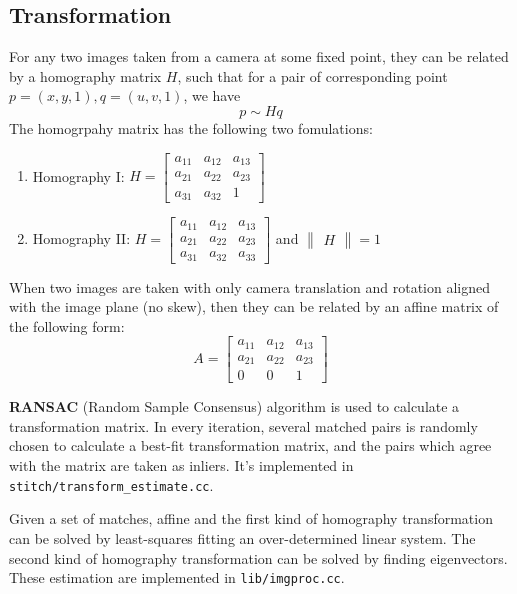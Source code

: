 
\subsection{Transformation}
\label{sec:transform}

For any two images taken from a camera at some fixed point,
they can be related by a homography matrix $H$,
such that for a pair of corresponding point $ p=(x,y,1), q = (u,v,1)$,
we have
\[ p \sim Hq\]
The homogrpahy matrix has the following two fomulations:
\begin{enumerate}
  \item Homography I: $H = \begin{bmatrix} a_{11} &a_{12} & a_{13}\\ a_{21} & a_{22} & a_{23}\\ a_{31} & a_{32} & 1\end{bmatrix}$

  \item Homography II:
    $H = \begin{bmatrix} a_{11} &a_{12} & a_{13}\\ a_{21} & a_{22} & a_{23}\\ a_{31} & a_{32} & a_{33}\end{bmatrix} $
    and $\begin{Vmatrix} H \end{Vmatrix} = 1$
\end{enumerate}

When two images are taken with only camera translation
and rotation aligned with the image plane (no skew),
then they can be related by an affine matrix of the following form:
\[ A = \begin{bmatrix} a_{11} &a_{12} & a_{13}\\ a_{21} & a_{22} & a_{23}\\ 0 & 0 & 1\end{bmatrix} \]

\textbf{RANSAC} (Random Sample Consensus) algorithm\cite{ransac} is used to calculate a transformation matrix.
In every iteration, several matched pairs is randomly chosen to calculate a best-fit transformation matrix,
and the pairs which agree with the matrix are taken as inliers. It's implemented in \verb|stitch/transform_estimate.cc|.

Given a set of matches, affine and the first kind of homography transformation can be solved
by least-squares fitting an over-determined linear system.
The second kind of homography transformation can be solved by finding eigenvectors.
These estimation are implemented in \verb|lib/imgproc.cc|.

